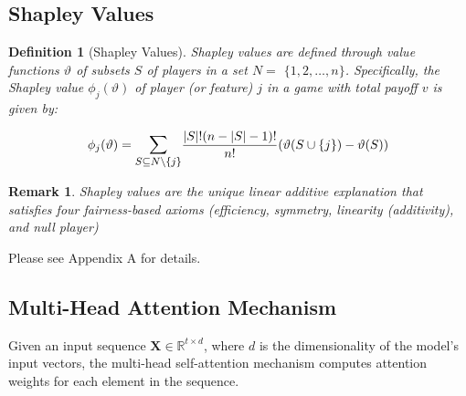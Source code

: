 \documentclass{article} %
\theoremstyle{bfnote}
\newtheorem{definition}[theorem]{Definition}
\newtheorem{remark}[theorem]{Remark}
\begin{document}
%
%
%

\subsection{Shapley Values}
\begin{definition} [Shapley Values]
	Shapley values are defined through value functions $\vartheta$ of subsets $S$ of players in a set $N=$ $\{1,2, \ldots, n\}$. Specifically, the Shapley value $\phi_j(\vartheta)$ of player (or feature) $j$ in a game with total payoff $v$ is given by:
\end{definition}

\begin{equation}
	\phi_j(\vartheta)=\mathlarger{\sum\limits_{S \subseteq N \backslash\{j\}}} \frac{|S| !(n-|S|-1) !}{n !}(\vartheta(S \cup\{j\})-\vartheta(S))
	\label{eq:7}
\end{equation}

\begin{remark}
Shapley values are the unique linear additive explanation that satisfies four fairness-based axioms (efficiency, symmetry, linearity (additivity), and null player)
\end{remark} Please see Appendix A for details.

\subsection{Multi-Head Attention Mechanism}
Given an input sequence $\bm{X}\in \mathbb{R}^{t \times d}$, where $d$ is the dimensionality of the model's input vectors, the multi-head self-attention mechanism computes attention weights for each element in the sequence.
\end{document}
